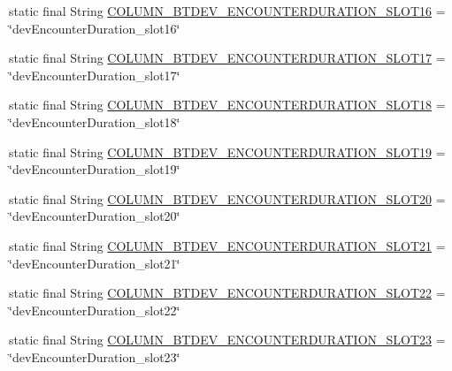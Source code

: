 \begin{DoxyCompactItemize}
\item 
static final String \hyperlink{classcs_1_1usense_1_1db_1_1_usense_s_q_lite_helper_a589e1ad81c339909353b98852a8c9dc7}{C\+O\+L\+U\+M\+N\+\_\+\+B\+T\+D\+E\+V\+\_\+\+E\+N\+C\+O\+U\+N\+T\+E\+R\+D\+U\+R\+A\+T\+I\+O\+N\+\_\+\+S\+L\+O\+T16} = \char`\"{}dev\+Encounter\+Duration\+\_\+slot16\char`\"{}
\item 
static final String \hyperlink{classcs_1_1usense_1_1db_1_1_usense_s_q_lite_helper_a92d8f84631c8f26af203b9018ccf7487}{C\+O\+L\+U\+M\+N\+\_\+\+B\+T\+D\+E\+V\+\_\+\+E\+N\+C\+O\+U\+N\+T\+E\+R\+D\+U\+R\+A\+T\+I\+O\+N\+\_\+\+S\+L\+O\+T17} = \char`\"{}dev\+Encounter\+Duration\+\_\+slot17\char`\"{}
\item 
static final String \hyperlink{classcs_1_1usense_1_1db_1_1_usense_s_q_lite_helper_a1d79ad971cd9048a16767dffda6a15b1}{C\+O\+L\+U\+M\+N\+\_\+\+B\+T\+D\+E\+V\+\_\+\+E\+N\+C\+O\+U\+N\+T\+E\+R\+D\+U\+R\+A\+T\+I\+O\+N\+\_\+\+S\+L\+O\+T18} = \char`\"{}dev\+Encounter\+Duration\+\_\+slot18\char`\"{}
\item 
static final String \hyperlink{classcs_1_1usense_1_1db_1_1_usense_s_q_lite_helper_a820e28ca3b35a3a1dc24bbe8fee31e56}{C\+O\+L\+U\+M\+N\+\_\+\+B\+T\+D\+E\+V\+\_\+\+E\+N\+C\+O\+U\+N\+T\+E\+R\+D\+U\+R\+A\+T\+I\+O\+N\+\_\+\+S\+L\+O\+T19} = \char`\"{}dev\+Encounter\+Duration\+\_\+slot19\char`\"{}
\item 
static final String \hyperlink{classcs_1_1usense_1_1db_1_1_usense_s_q_lite_helper_a2128f0b8e043fdd59f06d1165073646e}{C\+O\+L\+U\+M\+N\+\_\+\+B\+T\+D\+E\+V\+\_\+\+E\+N\+C\+O\+U\+N\+T\+E\+R\+D\+U\+R\+A\+T\+I\+O\+N\+\_\+\+S\+L\+O\+T20} = \char`\"{}dev\+Encounter\+Duration\+\_\+slot20\char`\"{}
\item 
static final String \hyperlink{classcs_1_1usense_1_1db_1_1_usense_s_q_lite_helper_a8aadb8b42892086ba8f49f28c5433603}{C\+O\+L\+U\+M\+N\+\_\+\+B\+T\+D\+E\+V\+\_\+\+E\+N\+C\+O\+U\+N\+T\+E\+R\+D\+U\+R\+A\+T\+I\+O\+N\+\_\+\+S\+L\+O\+T21} = \char`\"{}dev\+Encounter\+Duration\+\_\+slot21\char`\"{}
\item 
static final String \hyperlink{classcs_1_1usense_1_1db_1_1_usense_s_q_lite_helper_af65685d5825ed381fa951e67afe51a34}{C\+O\+L\+U\+M\+N\+\_\+\+B\+T\+D\+E\+V\+\_\+\+E\+N\+C\+O\+U\+N\+T\+E\+R\+D\+U\+R\+A\+T\+I\+O\+N\+\_\+\+S\+L\+O\+T22} = \char`\"{}dev\+Encounter\+Duration\+\_\+slot22\char`\"{}
\item 
static final String \hyperlink{classcs_1_1usense_1_1db_1_1_usense_s_q_lite_helper_a2d17d8cf8c309f82db193ca1a5218b55}{C\+O\+L\+U\+M\+N\+\_\+\+B\+T\+D\+E\+V\+\_\+\+E\+N\+C\+O\+U\+N\+T\+E\+R\+D\+U\+R\+A\+T\+I\+O\+N\+\_\+\+S\+L\+O\+T23} = \char`\"{}dev\+Encounter\+Duration\+\_\+slot23\char`\"{}

\end{DoxyCompactItemize}
